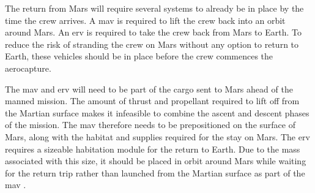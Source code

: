 The return from Mars will require several systems to already be in place by the time the crew arrives. A \gls{mav} is required to lift the crew back into an orbit around Mars. An \gls{erv} is required to take the crew back from Mars to Earth. To reduce the risk of stranding the crew on Mars without any option to return to Earth, these vehicles should be in place before the crew commences the aerocapture. 

The \gls{mav} and \gls{erv} will need to be part of the cargo sent to Mars ahead of the manned mission. The amount of thrust and propellant required to lift off from the Martian surface makes it infeasible to combine the ascent and descent phases of the mission. The \gls{mav} therefore needs to be prepositioned on the surface of Mars, along with the habitat and supplies required for the stay on Mars. The \gls{erv} requires a sizeable habitation module for the return to Earth. Due to the mass associated with this size, it should be placed in orbit around Mars while waiting for the return trip rather than launched from the Martian surface as part of the \gls{mav} \cite{Hoffman1997a}.